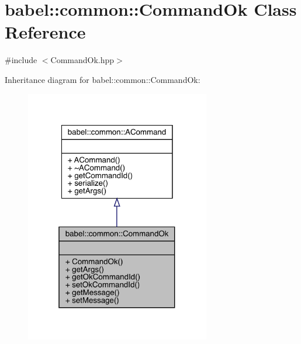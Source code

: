 \hypertarget{classbabel_1_1common_1_1_command_ok}{}\section{babel\+:\+:common\+:\+:Command\+Ok Class Reference}
\label{classbabel_1_1common_1_1_command_ok}


{\ttfamily \#include $<$Command\+Ok.\+hpp$>$}



Inheritance diagram for babel\+:\+:common\+:\+:Command\+Ok\+:\nopagebreak
\begin{figure}[H]
\begin{center}
\leavevmode
\includegraphics[width=229pt]{classbabel_1_1common_1_1_command_ok__inherit__graph}
\end{center}
\end{figure}


